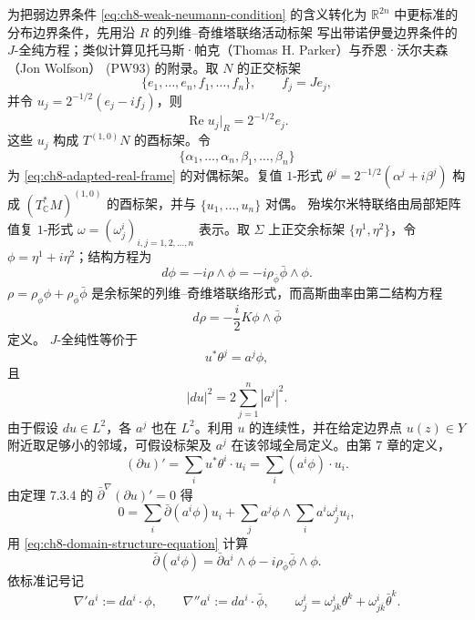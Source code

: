 为把弱边界条件 \eqref{eq:ch8-weak-neumann-condition} 的含义转化为
$\mathbb R^{2n}$ 中更标准的分布边界条件，先用沿 $R$ 的列维--奇维塔联络活动标架
写出带诺伊曼边界条件的 $J$-全纯方程；类似计算见托马斯·帕克（Thomas H. Parker）与乔恩·沃尔夫森（Jon Wolfson）
(PW93) 的附录。取 $N$ 的正交标架
\begin{equation}
 \{e_1,\ldots,e_n,f_1,\ldots,f_n\},\qquad f_j=Je_j,
 \label{eq:ch8-adapted-real-frame}
\end{equation}
并令 $u_j=2^{-1/2}(e_j-if_j)$，则
\begin{equation}
 \operatorname{Re}u_j|_R=2^{-1/2}e_j.
 \label{eq:ch8-real-part-unitary-frame}
\end{equation}
这些 $u_j$ 构成 $T^{(1,0)}N$ 的酉标架。令
\begin{equation}
 \{\alpha_1,\ldots,\alpha_n,\beta_1,\ldots,\beta_n\}
 \label{eq:ch8-dual-real-frame}
\end{equation}
为 \eqref{eq:ch8-adapted-real-frame} 的对偶标架。复值 $1$-形式
$\theta^j=2^{-1/2}(\alpha^j+i\beta^j)$ 构成
$(T_\mathbb C^*M)^{(1,0)}$ 的酉标架，并与 $\{u_1,\ldots,u_n\}$ 对偶。
殆埃尔米特联络由局部矩阵值复 $1$-形式
$\omega=(\omega^i_j)_{i,j=1,2,\ldots,n}$ 表示。取
$\Sigma$ 上正交余标架 $\{\eta^1,\eta^2\}$，令 $\phi=\eta^1+i\eta^2$；结构方程为
\begin{equation}
 d\phi=-i\rho\wedge\phi=-i\rho_{\bar\phi}\bar\phi\wedge\phi.
 \label{eq:ch8-domain-structure-equation}
\end{equation}
$\rho=\rho_\phi\phi+\rho_{\bar\phi}\bar\phi$ 是余标架的列维--奇维塔联络形式，而高斯曲率由第二结构方程
\[
 d\rho=-\frac i2K\phi\wedge\bar\phi
\]
定义。
$J$-全纯性等价于
\begin{equation}
 u^*\theta^j=a^j\phi,
 \label{eq:ch8-pullback-unitary-coframe}
\end{equation}
且
\[
 |du|^2=2\sum_{j=1}^n|a^j|^2.
\]
由于假设 $du\in L^2$，各 $a^j$ 也在 $L^2$。利用 $u$ 的连续性，并在给定边界点 $u(z)\in Y$ 附近取足够小的邻域，可假设标架及 $a^j$ 在该邻域全局定义。由第 7 章的定义，
\[
 (\partial u)'=\sum_i u^*\theta^i\cdot u_i
 =\sum_i(a^i\phi)\cdot u_i.
\]
由定理 7.3.4 的 $\bar\partial^\nabla(\partial u)'=0$ 得
\begin{equation}
 0=\sum_i\bar\partial(a^i\phi)u_i+\sum_j a^j\phi\wedge\sum_i a^i\omega^i_j u_i,
 \label{eq:ch8-moving-frame-preliminary}
\end{equation}
用 \eqref{eq:ch8-domain-structure-equation} 计算
\[
 \bar\partial(a^i\phi)=\bar\partial a^i\wedge\phi
 -i\rho_{\bar\phi}\bar\phi\wedge\phi.
\]
依标准记号记
\[
 \nabla'a^i:=da^i\cdot\phi,\qquad
 \nabla''a^i:=da^i\cdot\bar\phi,\qquad
 \omega^i_j=\omega^i_{jk}\theta^k+\omega^i_{j\bar k}\bar\theta^k.
\]

